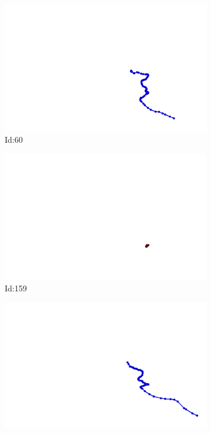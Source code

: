 \documentclass[12pt,twoside]{report}
\begin{document}
\begin{figure}
\centering
\begin{subfigure}[b]{0.20\textwidth}
\centering
\includegraphics[width=\textwidth]{../../trajectories/60.png}
\caption{Id:60}
\end{subfigure}
\begin{subfigure}[b]{0.20\textwidth}
\centering
\includegraphics[width=\textwidth]{../../trajectories/159.png}
\caption{Id:159}
\end{subfigure}
\begin{subfigure}[b]{0.20\textwidth}
\centering
\includegraphics[width=\textwidth]{../../trajectories/235.png}

\end{subfigure}
\end{figure}
\end{document}
